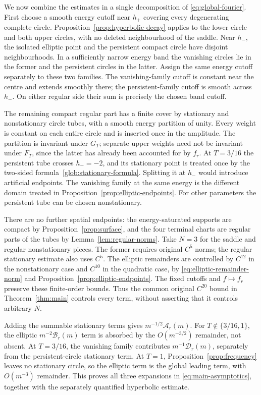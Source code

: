 We now combine the estimates in a single decomposition of
\eqref{eq:global-fourier}. First choose a smooth energy cutoff near \(h_+\)
covering every degenerating complete circle. Proposition~\ref{prop:hyperbolic-decay}
applies to the lower circle and both upper circles, with no deleted
neighbourhood of the saddle. Near \(h_-\), the isolated elliptic point and
the persistent compact circle have disjoint neighbourhoods. In a sufficiently
narrow energy band the vanishing circles lie in the former and the persistent
circles in the latter. Assign the same energy cutoff separately to these
two families. The vanishing-family cutoff is constant near the centre and
extends smoothly there; the persistent-family cutoff is smooth across
\(h_-\). On either regular side their sum is precisely the chosen band
cutoff.

The remaining compact regular part has a finite cover by stationary and
nonstationary circle tubes, with a smooth energy partition of unity.
Every weight is constant on each entire circle and is inserted once in
the amplitude. The partition is invariant under \(G_T\); separate upper
weights need not be invariant under \(F_T\), since the latter has already
been accounted for by \(f_r\). At \(T=3/16\) the persistent tube crosses
\(h_-=-2\), and its stationary point is treated once by the two-sided
formula~\eqref{glob:stationary-formula}. Splitting it at \(h_-\) would
introduce artificial endpoints. The vanishing family at the same energy
is the different domain treated in Proposition~\ref{prop:elliptic-endpoints}.
For other parameters the persistent tube can be chosen nonstationary.

There are no further spatial endpoints: the energy-saturated supports are
compact by Proposition~\ref{prop:surface}, and the four terminal charts
are regular parts of the tubes by Lemma~\ref{lem:regular-norms}.
Take \(N=3\) for the saddle and regular nonstationary pieces. The former
requires original \(C^5\) norms; the regular stationary estimate also uses
\(C^5\). The elliptic remainders are controlled by \(C^{12}\) in the
nonstationary case and \(C^{10}\) in the quadratic case, by
\eqref{eq:elliptic-remainder-norm} and Proposition~\ref{prop:elliptic-endpoints}.
The fixed cutoffs and \(f\mapsto f_r\) preserve these finite-order bounds.
Thus the common original \(C^{20}\) bound in Theorem~\ref{thm:main} controls
every term, without asserting that it controls arbitrary \(N\).

Adding the summable stationary terms gives \(m^{-1/2}\mathcal A_r(m)\).
For \(T\notin\{3/16,1\}\), the elliptic \(m^{-2}\mathcal B_r(m)\) term is
absorbed by the \(O(m^{-3/2})\) remainder, not absent. At \(T=3/16\), the
vanishing family contributes \(m^{-1}\mathcal D_r(m)\), separately from the
persistent-circle stationary term. At \(T=1\), Proposition~\ref{prop:frequency}
leaves no stationary circle, so the elliptic term is the global leading
term, with \(O(m^{-3})\) remainder. This proves all three expansions in
\eqref{eq:main-asymptotics}, together with the separately quantified
hyperbolic estimate.

